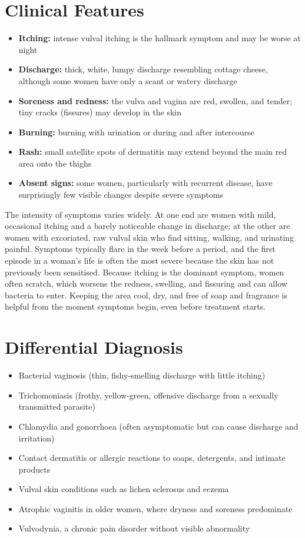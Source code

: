 \section*{Clinical Features}
\begin{itemize}
    \item \textbf{Itching:} intense vulval itching is the hallmark symptom and may be worse at night
    \item \textbf{Discharge:} thick, white, lumpy discharge resembling cottage cheese, although some women have only a scant or watery discharge
    \item \textbf{Soreness and redness:} the vulva and vagina are red, swollen, and tender; tiny cracks (fissures) may develop in the skin
    \item \textbf{Burning:} burning with urination or during and after intercourse
    \item \textbf{Rash:} small satellite spots of dermatitis may extend beyond the main red area onto the thighs
    \item \textbf{Absent signs:} some women, particularly with recurrent disease, have surprisingly few visible changes despite severe symptoms
\end{itemize}

The intensity of symptoms varies widely. At one end are women with mild, occasional itching and a barely noticeable change in discharge; at the other are women with excoriated, raw vulval skin who find sitting, walking, and urinating painful. Symptoms typically flare in the week before a period, and the first episode in a woman's life is often the most severe because the skin has not previously been sensitised. Because itching is the dominant symptom, women often scratch, which worsens the redness, swelling, and fissuring and can allow bacteria to enter. Keeping the area cool, dry, and free of soap and fragrance is helpful from the moment symptoms begin, even before treatment starts.

\section*{Differential Diagnosis}
\begin{itemize}
    \item Bacterial vaginosis (thin, fishy-smelling discharge with little itching)
    \item Trichomoniasis (frothy, yellow-green, offensive discharge from a sexually transmitted parasite)
    \item Chlamydia and gonorrhoea (often asymptomatic but can cause discharge and irritation)
    \item Contact dermatitis or allergic reactions to soaps, detergents, and intimate products
    \item Vulval skin conditions such as lichen sclerosus and eczema
    \item Atrophic vaginitis in older women, where dryness and soreness predominate
    \item Vulvodynia, a chronic pain disorder without visible abnormality
\end{itemize}

